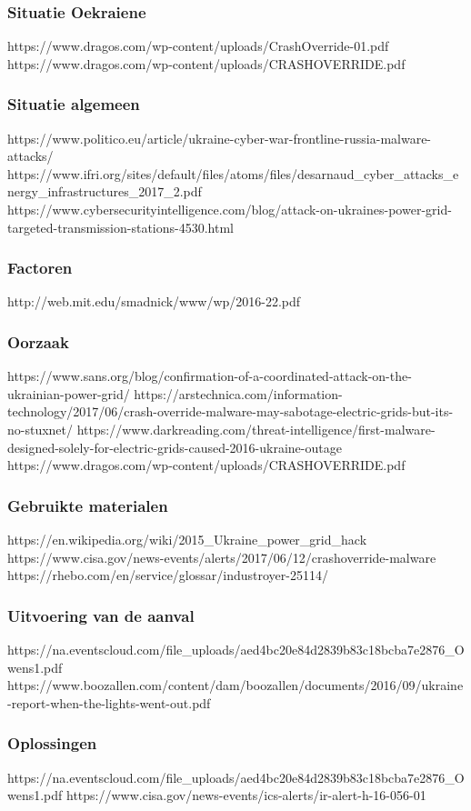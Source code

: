 \documentclass{article}
\begin{document}
	\subsubsection{Situatie Oekraiene}
	https://www.dragos.com/wp-content/uploads/CrashOverride-01.pdf
	https://www.dragos.com/wp-content/uploads/CRASHOVERRIDE.pdf
	\subsubsection{Situatie algemeen}
	https://www.politico.eu/article/ukraine-cyber-war-frontline-russia-malware-attacks/
	https://www.ifri.org/sites/default/files/atoms/files/desarnaud_cyber_attacks_energy_infrastructures_2017_2.pdf
	https://www.cybersecurityintelligence.com/blog/attack-on-ukraines-power-grid-targeted-transmission-stations-4530.html
	
	\subsubsection{Factoren}
	http://web.mit.edu/smadnick/www/wp/2016-22.pdf
	\subsubsection{Oorzaak}
	https://www.sans.org/blog/confirmation-of-a-coordinated-attack-on-the-ukrainian-power-grid/
	https://arstechnica.com/information-technology/2017/06/crash-override-malware-may-sabotage-electric-grids-but-its-no-stuxnet/
	https://www.darkreading.com/threat-intelligence/first-malware-designed-solely-for-electric-grids-caused-2016-ukraine-outage
	https://www.dragos.com/wp-content/uploads/CRASHOVERRIDE.pdf
	\subsubsection{Gebruikte materialen}
	https://en.wikipedia.org/wiki/2015_Ukraine_power_grid_hack
	https://www.cisa.gov/news-events/alerts/2017/06/12/crashoverride-malware
	https://rhebo.com/en/service/glossar/industroyer-25114/
	
	
	\subsubsection{Uitvoering van de aanval}
	https://na.eventscloud.com/file_uploads/aed4bc20e84d2839b83c18bcba7e2876_Owens1.pdf
	https://www.boozallen.com/content/dam/boozallen/documents/2016/09/ukraine-report-when-the-lights-went-out.pdf
	\subsubsection{Oplossingen}
	https://na.eventscloud.com/file_uploads/aed4bc20e84d2839b83c18bcba7e2876_Owens1.pdf
	https://www.cisa.gov/news-events/ics-alerts/ir-alert-h-16-056-01
\end{document}
